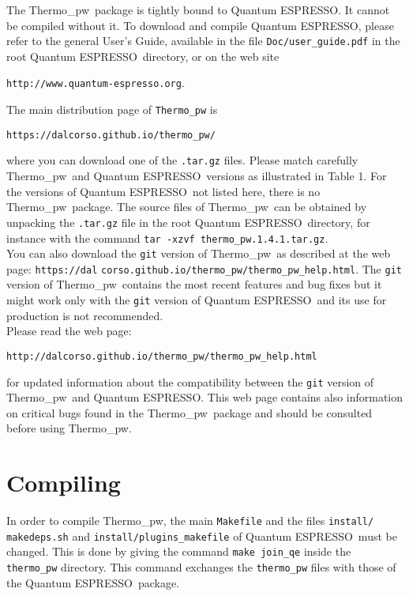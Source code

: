 \documentclass[12pt,a4paper,twoside]{report}
\def\qe{{\sc Quantum ESPRESSO}}
\def\thermo{{\sc Thermo}\_{\sc pw}}
\begin{document}
The \thermo\ package is tightly bound to \qe. It cannot be compiled without
it. To download and compile \qe, please 
refer to the general User's Guide, available in the file \texttt{Doc/user\_guide.pdf}
in the root \qe\ directory, or on the web site 
\begin{center}
{\texttt{http://www.quantum-espresso.org}}.
\end{center}
The main distribution page of \texttt{Thermo\_pw} is 
\begin{center}
\texttt{https://dalcorso.github.io/thermo\_pw/} 
\end{center}
where you can download one of the \texttt{.tar.gz} files.
Please match carefully \thermo\ and \qe\ versions
as illustrated in Table 1. 
For the versions of \qe\ not listed here, there is no \thermo\ 
package. The source files of \thermo\ can be obtained by
unpacking the \texttt{.tar.gz} file in the root \qe\ directory, for
instance with the command \texttt{tar -xzvf thermo\_pw.1.4.1.tar.gz}.\\
You can also download the \texttt{git} version of 
\thermo\ as described at
the web page: 
\texttt{https://dal} \texttt{corso.github.io/thermo\_pw/thermo\_pw\_help.html}.
The \texttt{git} version of \thermo\ contains the most recent
features and bug fixes but it might work only with the \texttt{git} 
version of \qe\ and its use for production is not recommended. \\
Please read the web page: 
\begin{center}
\texttt{http://dalcorso.github.io/thermo\_pw/thermo\_pw\_help.html} 
\end{center}
for updated information about the compatibility between the \texttt{git} 
version of \thermo\ and \qe. 
This web page contains also information on critical bugs found in the 
\thermo\ package and should be consulted before using 
\thermo.

\newpage
{\color{coral}\section{Compiling}}
\color{black}

In order to compile \thermo, the main \texttt{Makefile} and the files
\texttt{install/} \texttt{makedeps.sh} and \texttt{install/plugins\_makefile}
of \qe\ must be changed. This is done by giving the command 
\texttt{make join\_qe} inside the \texttt{thermo\_pw} directory. 
This command exchanges
the \texttt{thermo\_pw} files with those of the \qe\ package.
\end{document}
